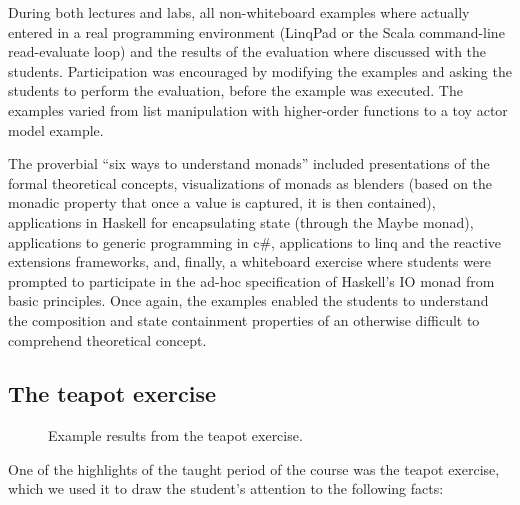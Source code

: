 \documentclass[conference]{IEEEtran}
\begin{document}
During both lectures and labs, all non-whiteboard examples where actually
entered in a real programming environment (LinqPad or the Scala command-line
read-evaluate loop) and the results of the evaluation where discussed with the
students. Participation was encouraged by modifying the examples and asking the
students to perform the evaluation, before the example was executed. The
examples varied from list manipulation with higher-order functions to 
a toy actor model example.

The proverbial ``six ways to understand monads'' included presentations of the
formal theoretical concepts, visualizations of monads as blenders (based on the
monadic property that once a value is captured, it is then contained),
applications in Haskell for encapsulating state (through the \textsf{Maybe}
monad), applications to generic programming in {\sc c\#}, applications to {\sc
linq} and the reactive extensions frameworks, and, finally, a whiteboard
exercise where students were prompted to participate in the ad-hoc specification
of Haskell's \textsf{IO} monad from basic principles. Once again, the examples
enabled the students to understand the composition and state containment
properties of an otherwise difficult to comprehend theoretical concept.

\subsection{The teapot exercise}

\begin{figure*}
\centering
\label{fig:teapots}
\caption[]{Example results from the teapot exercise.}
\end{figure*}

One of the highlights of the taught period of the course was the teapot
exercise, which 
we used it to draw the student's attention to the following facts:
\end{document}

